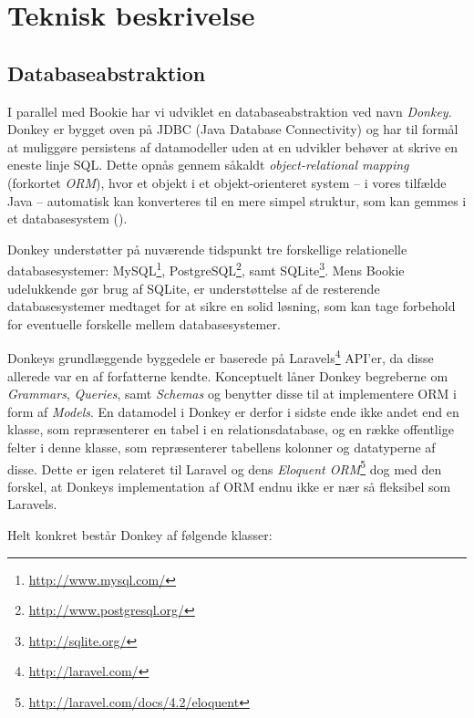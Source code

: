 \chapter{Teknisk beskrivelse}

\section{Databaseabstraktion}

I parallel med Bookie har vi udviklet en databaseabstraktion ved navn \textit{Donkey}. Donkey er bygget oven på JDBC (Java Database Connectivity) og har til formål at muliggøre persistens af datamodeller uden at en udvikler behøver at skrive en eneste linje SQL. Dette opnås gennem såkaldt \textit{object-relational mapping} (forkortet \textit{ORM}), hvor et objekt i et objekt-orienteret system – i vores tilfælde Java – automatisk kan konverteres til en mere simpel struktur, som kan gemmes i et databasesystem (\cite{wiki:orm}).

Donkey understøtter på nuværende tidspunkt tre forskellige relationelle databasesystemer: MySQL\footnote{\url{http://www.mysql.com/}}, PostgreSQL\footnote{\url{http://www.postgresql.org/}}, samt SQLite\footnote{\url{http://sqlite.org/}}. Mens Bookie udelukkende gør brug af SQLite, er understøttelse af de resterende databasesystemer medtaget for at sikre en solid løsning, som kan tage forbehold for eventuelle forskelle mellem databasesystemer.

Donkeys grundlæggende byggedele er baserede på Laravels\footnote{\url{http://laravel.com/}} API'er, da disse allerede var en af forfatterne kendte. Konceptuelt låner Donkey begreberne om \textit{Grammars}, \textit{Queries}, samt \textit{Schemas} og benytter disse til at implementere ORM i form af \textit{Models}. En datamodel i Donkey er derfor i sidste ende ikke andet end en klasse, som repræsenterer en tabel i en relationsdatabase, og en række offentlige felter i denne klasse, som repræsenterer tabellens kolonner og datatyperne af disse. Dette er igen relateret til Laravel og dens \textit{Eloquent ORM}\footnote{\url{http://laravel.com/docs/4.2/eloquent}} dog med den forskel, at Donkeys implementation af ORM endnu ikke er nær så fleksibel som Laravels.

Helt konkret består Donkey af følgende klasser:

